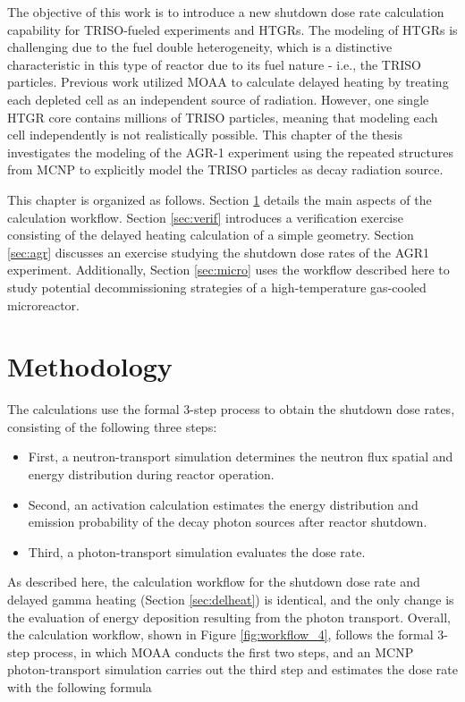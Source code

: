 The objective of this work is to introduce a new shutdown dose rate calculation capability for TRISO-fueled experiments and HTGRs.
The modeling of HTGRs is challenging due to the fuel double heterogeneity, which is a distinctive characteristic in this type of reactor due to its fuel nature - i.e., the \gls*{TRISO} particles.
Previous work \cite{fairhurst_decay_2022, fairhurst_demonstration_2022, fairhurst_database_2022} utilized MOAA to calculate delayed heating by treating each depleted cell as an independent source of radiation.
However, one single HTGR core contains millions of TRISO particles, meaning that modeling each cell independently is not realistically possible.
This chapter of the thesis investigates the modeling of the AGR-1 experiment using the repeated structures from MCNP to explicitly model the TRISO particles as decay radiation source.

This chapter is organized as follows.
Section \ref{sec:methodology} details the main aspects of the calculation workflow.
Section \ref{sec:verif} introduces a verification exercise consisting of the delayed heating calculation of a simple geometry.
Section \ref{sec:agr} discusses an exercise studying the shutdown dose rates of the \gls*{AGR1} experiment.
Additionally, Section \ref{sec:micro} uses the workflow described here to study potential decommissioning strategies of a high-temperature gas-cooled microreactor.


\section{Methodology}
\label{sec:methodology}

The calculations use the formal 3-step process to obtain the shutdown dose rates, consisting of the following three steps:
\begin{itemize}
  \item First, a neutron-transport simulation determines the neutron flux spatial and energy distribution during reactor operation.
  \item Second, an activation calculation estimates the energy distribution and emission probability of the decay photon sources after reactor shutdown.
  \item Third, a photon-transport simulation evaluates the dose rate.
\end{itemize}

As described here, the calculation workflow for the shutdown dose rate and delayed gamma heating (Section \ref{sec:delheat}) is identical, and the only change is the evaluation of energy deposition resulting from the photon transport.
Overall, the calculation workflow, shown in Figure \ref{fig:workflow_4}, follows the formal 3-step process, in which MOAA conducts the first two steps, and an MCNP photon-transport simulation carries out the third step and estimates the dose rate with the following formula

